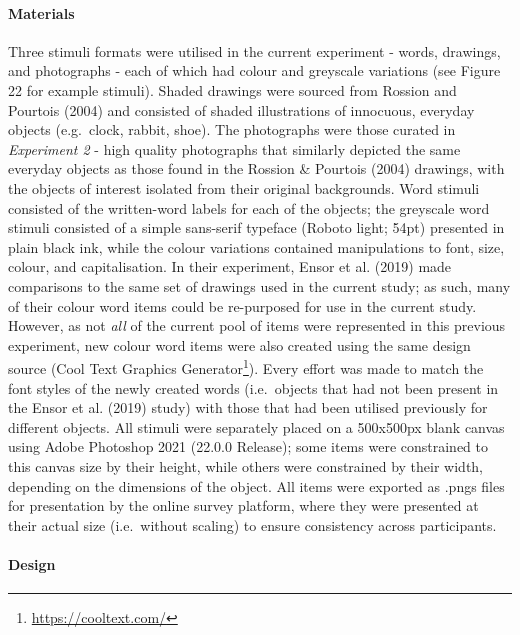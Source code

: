\documentclass[
  11pt,
]{article}
\begin{document}
\hypertarget{materials-4}{%
\paragraph{Materials}\label{materials-4}}

\hfill\break Three stimuli formats were utilised in the current
experiment - words, drawings, and photographs - each of which had colour
and greyscale variations (see Figure 22 for example stimuli). Shaded
drawings were sourced from Rossion and Pourtois (2004) and consisted of
shaded illustrations of innocuous, everyday objects (e.g.~clock, rabbit,
shoe). The photographs were those curated in \emph{Experiment 2} - high
quality photographs that similarly depicted the same everyday objects as
those found in the Rossion \& Pourtois (2004) drawings, with the objects
of interest isolated from their original backgrounds. Word stimuli
consisted of the written-word labels for each of the objects; the
greyscale word stimuli consisted of a simple sans-serif typeface (Roboto
light; 54pt) presented in plain black ink, while the colour variations
contained manipulations to font, size, colour, and capitalisation. In
their experiment, Ensor et al. (2019) made comparisons to the same set
of drawings used in the current study; as such, many of their colour
word items could be re-purposed for use in the current study. However,
as not \emph{all} of the current pool of items were represented in this
previous experiment, new colour word items were also created using the
same design source
(Cool Text Graphics Generator\footnote{\url{https://cooltext.com/}}).
Every effort was made to match the font styles of the newly created
words (i.e.~objects that had not been present in the Ensor et al. (2019)
study) with those that had been utilised previously for different
objects. All stimuli were separately placed on a 500x500px blank canvas
using Adobe Photoshop 2021 (22.0.0 Release); some items were constrained
to this canvas size by their height, while others were constrained by
their width, depending on the dimensions of the object. All items were
exported as .pngs files for presentation by the online survey platform,
where they were presented at their actual size (i.e.~without scaling) to
ensure consistency across participants.

\hypertarget{design-4}{%
\paragraph{Design}\label{design-4}}
\end{document}
